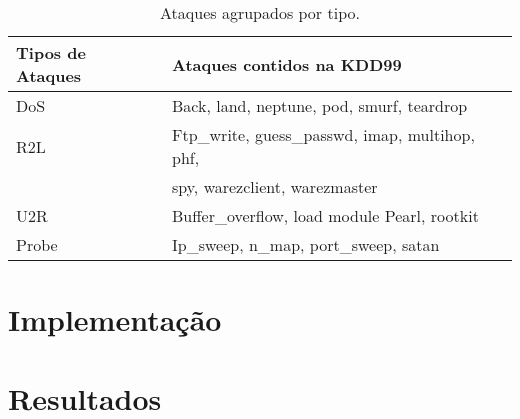 \begin{table}[h]
\centering
\caption{Ataques agrupados por tipo.}
\vspace{0.5cm}
\begin{tabular}{|l|l|}
\hline
\textbf{Tipos de Ataques} & \textbf{Ataques contidos na KDD99}\\
\hline
DoS &	Back, land, neptune, pod, smurf, teardrop \\
\hline
R2L &	Ftp\_write, guess\_passwd, imap, multihop, phf,\\ & spy, warezclient, warezmaster \\
\hline
U2R &	Buffer\_overflow, load module Pearl, rootkit\\
\hline
Probe &	Ip\_sweep, n\_map, port\_sweep, satan\\
\hline
\end{tabular}
\end{table}




  \section{Implementação}

  \section{Resultados}
